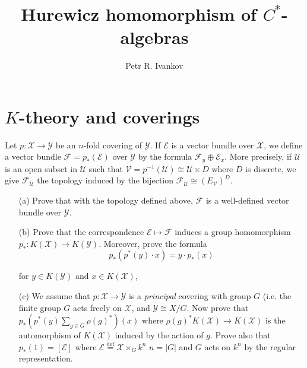 \documentclass{beamer}
\title{Hurewicz homomorphism of $C^*$-algebras}
\institute
{
 Algebras in analisys
}
\author{Petr R. Ivankov  }
\theoremstyle{plain}
\newcommand{\E}{\mathcal{E}}                 %
\newcommand{\F}{\mathcal{F}}                 %
\newcommand{\sU}{\mathcal{U}}       %
\newcommand{\sV}{\mathcal{V}}       %
\newcommand{\sX}{\mathcal{X}}       %
\newcommand{\sY}{\mathcal{Y}}       %
\newcommand{\bydef}{\stackrel{\mathrm{def}}{=}}
\begin{document}
\begin{frame}
  \titlepage
\end{frame}
\section{$K$-theory and coverings}

	Let $p : \sX \to \sY$ be an $n$-fold covering of $\sY$. If $\E$ is a vector bundle over $\sX$, we 
	define a vector bundle $\F = p_*\left( \E\right) $ over $\sY$ by the formula $\F_y \oplus \E_x$. More precisely, if $\sU$ is an open subset in $\sU$ such that $\sV = p^{-1}\left(\sU \right) \cong \sU \times D$ where $D$ is 
	discrete, we give $\F_\sU$ the topology induced by the bijection $\F_\sU \cong \left(E_\sV \right)^D$.
	\begin{enumerate}
		\item[(a)] Prove that with the topology defined above, $\F$ is a well-defined vector 
		bundle over $\sY$. 
		\item[(b)] Prove that the correspondence $\E \mapsto \F$ induces a group homomorphism 
		$p_*:K\left(\sX \right) \to K\left(\sY \right)$. Moreover, prove the formula 
		$$
		p_*\left(p^*\left(y \right)\cdot x  \right) = y \cdot p_*\left(x \right) 
		$$
		
		for $y\in K\left( \sY\right)$ and $x \in K\left(\sX \right)$,
		\item[(c)]   We assume that $p : \sX \to \sY$ is a \textit{principal} covering with group $G$ (i.e. the finite 	group $G$ acts freely on $\sX$, and $\sY \cong X/G$. Now prove that $p_*\left(p^*\left(y \right)\sum_{g \in G}\rho\left( g\right)^*\right) \left( x\right)$  
		where $\rho\left( g\right)^*K\left(\sX \right)\to K\left(\sX \right)$ is the automorphism of $K\left(\sX \right)$  induced by the action of 	$g$. Prove also that $p_*\left(1 \right)  = \left[\E\right]$ where $\E \bydef \sX \times_G k^n$ $n = \left|G \right|$  and $G$ acts 
		on $k^n$ by the regular representation. 
		
	\end{enumerate} 
\end{document}
